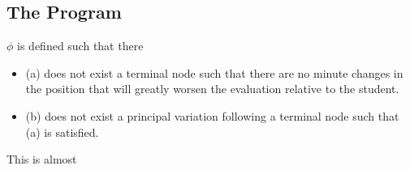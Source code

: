 \documentclass{article}
\begin{document}
\subsection{The Program}
$\phi$ is defined such that there
\begin{itemize}
  \item (a) does not exist a terminal node such that there are no minute changes in the position that will greatly worsen the evaluation relative to the student.
  \item (b) does not exist a principal variation following a terminal node such that (a) is satisfied.
\end{itemize}

This is almost 
\end{document}
